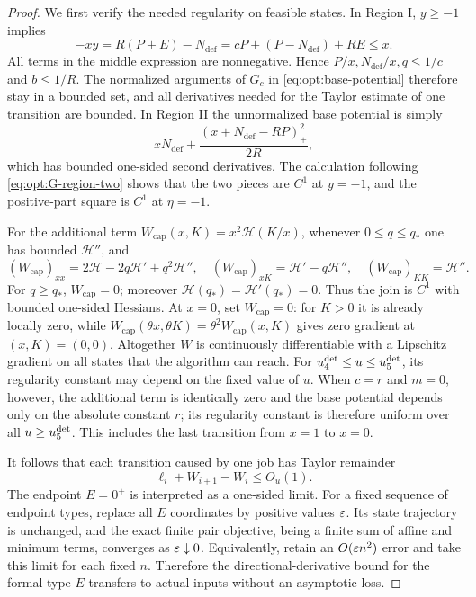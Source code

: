 \begin{proof}
We first verify the needed regularity on feasible states.
In Region I, $y\ge-1$ implies
\begin{equation}
 -xy=R(P+E)-N_{\mathrm{def}}=cP+(P-N_{\mathrm{def}})+RE\le x.
 \label{eq:opt:feasible-compactness}
\end{equation}
All terms in the middle expression are nonnegative.  Hence
$P/x,N_{\mathrm{def}}/x,q\le1/c$ and $b\le1/R$.  The normalized arguments of
$G_c$ in \eqref{eq:opt:base-potential} therefore stay in a bounded set, and
all derivatives needed for the Taylor estimate of one transition are
bounded.  In
Region II the unnormalized base potential is simply
\begin{equation}
 xN_{\mathrm{def}}+\frac{(x+N_{\mathrm{def}}-RP)_+^2}{2R},
 \label{eq:opt:region-two-base-potential}
\end{equation}
which has bounded one-sided second derivatives.  The calculation following
\cref{eq:opt:G-region-two} shows that the two pieces are $C^1$ at $y=-1$,
and the positive-part square is $C^1$ at
$\eta=-1$.

For the additional term $W_{\mathrm{cap}}(x,K)=x^2\mathcal H(K/x)$, whenever
$0\le q\le q_*$ one has bounded $\mathcal H''$, and
\begin{equation}
 (W_{\mathrm{cap}})_{xx}=2\mathcal H-2q\mathcal H'+q^2\mathcal H'',
 \quad
 (W_{\mathrm{cap}})_{xK}=\mathcal H'-q\mathcal H'',
 \quad
 (W_{\mathrm{cap}})_{KK}=\mathcal H''.
 \label{eq:opt:reserve-hessian}
\end{equation}
For $q\ge q_*$, $W_{\mathrm{cap}}=0$; moreover
$\mathcal H(q_*)=\mathcal H'(q_*)=0$.  Thus the join is $C^1$ with
bounded one-sided Hessians.  At $x=0$, set $W_{\mathrm{cap}}=0$: for $K>0$ it is
already locally zero, while
$W_{\mathrm{cap}}(\theta x,\theta K)=\theta^2W_{\mathrm{cap}}(x,K)$ gives zero gradient
at $(x,K)=(0,0)$.  Altogether $W$ is continuously differentiable with a Lipschitz
gradient on all states that the algorithm can reach.  For
$u_{4}^{\mathrm{det}}\le u\le u_{5}^{\mathrm{det}}$, its regularity constant may depend on the fixed
value of $u$.
When $c=r$ and $m=0$, however, the additional term is identically zero and the base
potential depends only on the absolute constant $r$; its regularity constant is
therefore uniform over all $u\ge u_{5}^{\mathrm{det}}$.  This includes the last transition
from $x=1$ to $x=0$.

It follows that each transition caused by one job has Taylor remainder
\begin{equation}
 \ell_i+W_{i+1}-W_i\le O_u(1).
 \label{eq:opt:finite-taylor}
\end{equation}
The endpoint $E=0^+$ is interpreted as a one-sided limit.  For a fixed sequence of
endpoint types, replace all $E$ coordinates by positive values $\varepsilon$.  Its
state trajectory is unchanged, and the exact finite pair objective, being
a finite sum of affine and minimum terms, converges as
$\varepsilon\downarrow0$.  Equivalently, retain an
$O(\varepsilon n^2)$ error and take this limit for each fixed $n$.
Therefore the directional-derivative bound for the formal type $E$ transfers to
actual inputs without an asymptotic loss.


\end{proof}
